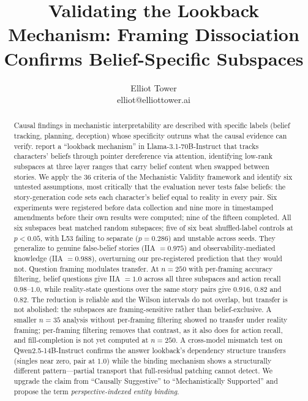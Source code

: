 \documentclass{article}
\title{Validating the Lookback Mechanism: Framing Dissociation Confirms Belief-Specific Subspaces}
\author{\name Elliot Tower \\
      \email elliot@elliottower.ai}
\begin{document}
\maketitle

\begin{abstract}
Causal findings in mechanistic interpretability are described with specific labels (belief tracking, planning, deception) whose specificity outruns what the causal evidence can verify. \citet{prakash2025lookback} report a ``lookback mechanism'' in Llama-3.1-70B-Instruct that tracks characters' beliefs through pointer dereference via attention, identifying low-rank subspaces at three layer ranges that carry belief content when swapped between stories. We apply the 36 criteria of the Mechanistic Validity framework and identify six untested assumptions, most critically that the evaluation never tests false beliefs: the story-generation code sets each character's belief equal to reality in every pair. Six experiments were registered before data collection and nine more in timestamped amendments before their own results were computed; nine of the fifteen completed. All six subspaces beat matched random subspaces; five of six beat shuffled-label controls at $p < 0.05$, with L53 failing to separate ($p = 0.286$) and unstable across seeds. They generalize to genuine false-belief stories (IIA $= 0.975$) and observability-mediated knowledge (IIA $= 0.988$), overturning our pre-registered prediction that they would not. Question framing modulates transfer. At $n = 250$ with per-framing accuracy filtering, belief questions give IIA $= 1.0$ across all three subspaces and action recall $0.98$--$1.0$, while reality-state questions over the same story pairs give $0.916$, $0.82$ and $0.82$. The reduction is reliable and the Wilson intervals do not overlap, but transfer is not abolished: the subspaces are framing-sensitive rather than belief-exclusive. A smaller $n = 35$ analysis without per-framing filtering showed no transfer under reality framing; per-framing filtering removes that contrast, as it also does for action recall, and fill-completion is not yet computed at $n = 250$. A cross-model mismatch test on Qwen2.5-14B-Instruct confirms the answer lookback's dependency structure transfers (singles near zero, pair at $1.0$) while the binding mechanism shows a structurally different pattern---partial transport that full-residual patching cannot detect. We upgrade the claim from ``Causally Suggestive'' to ``Mechanistically Supported'' and propose the term \emph{perspective-indexed entity binding}.
\end{abstract}
\end{document}
